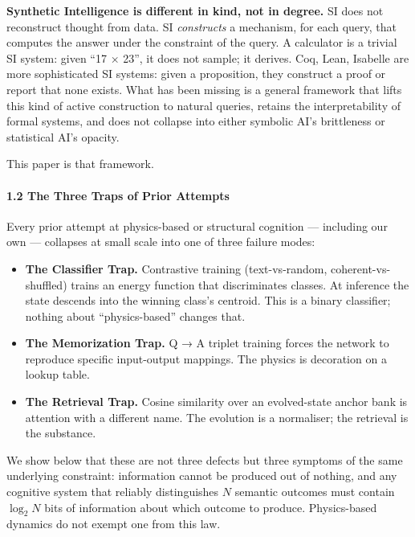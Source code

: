 \documentclass[
  11pt,
  a4paper,
]{article}
\providecommand{\tightlist}{%
  \setlength{\itemsep}{0pt}\setlength{\parskip}{0pt}}
\begin{document}
\textbf{Synthetic Intelligence is different in kind, not in degree.} SI
does not reconstruct thought from data. SI \emph{constructs} a
mechanism, for each query, that computes the answer under the constraint
of the query. A calculator is a trivial SI system: given ``17 × 23'', it
does not sample; it derives. Coq, Lean, Isabelle are more sophisticated
SI systems: given a proposition, they construct a proof or report that
none exists. What has been missing is a general framework that lifts
this kind of active construction to natural queries, retains the
interpretability of formal systems, and does not collapse into either
symbolic AI's brittleness or statistical AI's opacity.

This paper is that framework.

\paragraph{1.2 The Three Traps of Prior
Attempts}\label{the-three-traps-of-prior-attempts}

Every prior attempt at physics-based or structural cognition ---
including our own --- collapses at small scale into one of three failure
modes:

\begin{itemize}
\tightlist
\item
  \textbf{The Classifier Trap.} Contrastive training (text-vs-random,
  coherent-vs-shuffled) trains an energy function that discriminates
  classes. At inference the state descends into the winning class's
  centroid. This is a binary classifier; nothing about ``physics-based''
  changes that.
\item
  \textbf{The Memorization Trap.} Q → A triplet training forces the
  network to reproduce specific input-output mappings. The physics is
  decoration on a lookup table.
\item
  \textbf{The Retrieval Trap.} Cosine similarity over an evolved-state
  anchor bank is attention with a different name. The evolution is a
  normaliser; the retrieval is the substance.
\end{itemize}

We show below that these are not three defects but three symptoms of the
same underlying constraint: information cannot be produced out of
nothing, and any cognitive system that reliably distinguishes \(N\)
semantic outcomes must contain \(\log_2 N\) bits of information about
which outcome to produce. Physics-based dynamics do not exempt one from
this law.
\end{document}
